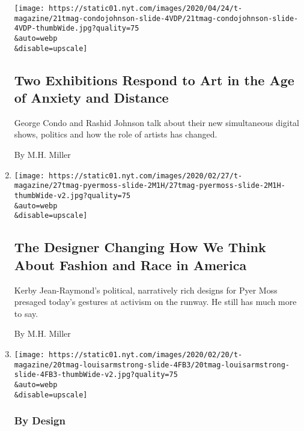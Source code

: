 \begin{enumerate}
  \texttt{[image: https://static01.nyt.com/images/2020/04/24/t-magazine/21tmag-condojohnson-slide-4VDP/21tmag-condojohnson-slide-4VDP-thumbWide.jpg?quality=75\\\&auto=webp\\\&disable=upscale]}

  \hypertarget{two-exhibitions-respond-to-art-in-the-age-of-anxiety-and-distance}{%
  \subsection{Two Exhibitions Respond to Art in the Age of Anxiety and
  Distance}\label{two-exhibitions-respond-to-art-in-the-age-of-anxiety-and-distance}}

  George Condo and Rashid Johnson talk about their new simultaneous
  digital shows, politics and how the role of artists has changed.

  By M.H. Miller
\item
  \href{/2020/03/05/t-magazine/pyer-moss-kerby-jean-raymond.html}{}

  \texttt{[image: https://static01.nyt.com/images/2020/02/27/t-magazine/27tmag-pyermoss-slide-2M1H/27tmag-pyermoss-slide-2M1H-thumbWide-v2.jpg?quality=75\\\&auto=webp\\\&disable=upscale]}

  \hypertarget{the-designer-changing-how-we-think-about-fashion-and-race-in-america}{%
  \subsection{The Designer Changing How We Think About Fashion and Race
  in
  America}\label{the-designer-changing-how-we-think-about-fashion-and-race-in-america}}

  Kerby Jean-Raymond's political, narratively rich designs for Pyer Moss
  presaged today's gestures at activism on the runway. He still has much
  more to say.

  By M.H. Miller
\item
  \href{/2020/02/20/t-magazine/louis-armstrong-home-queens.html}{}

  \texttt{[image: https://static01.nyt.com/images/2020/02/20/t-magazine/20tmag-louisarmstrong-slide-4FB3/20tmag-louisarmstrong-slide-4FB3-thumbWide-v2.jpg?quality=75\\\&auto=webp\\\&disable=upscale]}

  \hypertarget{by-design}{%
  \subsubsection{By Design}\label{by-design}}

  \hypertarget{louis-armstrong-the-king-of-queens}{%
}
\end{enumerate}
